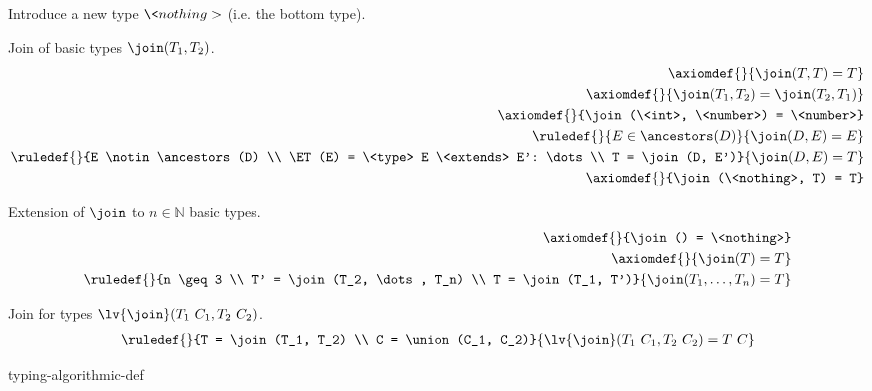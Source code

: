 \begin{defbox}
Introduce a new type $\<nothing>$ (i.e. the bottom type).

Join of basic types $\join(T_1, T_2)$.
\begin{align*}
\axiomdef{}{\join(T, T) = T}
\\
\axiomdef{}{\join(T_1, T_2) = \join(T_2, T_1)}
\\
\axiomdef{}{\join(\<int>, \<number>) = \<number>}
\\
\ruledef{}{E \in \ancestors(D)}{\join(D, E) = E}
\\
\ruledef{}{E \notin \ancestors(D) \\ \ET(E) = \<type> E \<extends> E': \dots \\ T = \join(D, E')}{\join(D, E) = T}
\\
\axiomdef{}{\join(\<nothing>, T) = T}
\end{align*}

Extension of $\join$ to $n \in \mathbb{N}$ basic types.
\begin{align*}
\axiomdef{}{\join() = \<nothing>}
\\
\axiomdef{}{\join(T) = T}
\\
\ruledef{}{n \geq 3 \\ T' = \join(T_2, \dots, T_n) \\ T = \join(T_1, T')}{\join(T_1, \dots, T_n) = T}
\end{align*}

Join for types $\lv{\join}(T_1\ C_1, T_2\ C_2)$.
\begin{align*}
\ruledef{}{T = \join(T_1, T_2) \\ C = \union(C_1, C_2)}{\lv{\join}(T_1\ C_1, T_2\ C_2) = T\ C}
\end{align*}

{typing-algorithmic-def}
\end{defbox}
